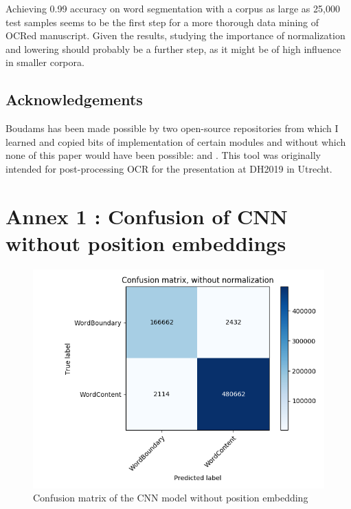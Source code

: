 \documentclass{jdmdh}
\begin{document}
Achieving 0.99 accuracy on word segmentation with a corpus as large as 25,000 test samples seems to be the first step for a more thorough data mining of OCRed manuscript. Given the results, studying the importance of normalization and lowering should probably be a further step, as it might be of high influence in smaller corpora. 

\subsection{Acknowledgements}

Boudams has been made possible by two open-source repositories from which I learned and copied bits of implementation of certain modules and without which none of this paper would have been possible: \citet{enrique_manjavacas_2019_2654987} and \citet{bentrevett}. This tool was originally intended for post-processing OCR for the presentation \citet{pinchecampsclerice} at DH2019 in Utrecht.






\appendix\footnotesize

\section{Annex 1 : Confusion of CNN without position embeddings}

\begin{figure}[H]
  \centering
  \includegraphics[width=\linewidth]{confusion.png}
  \caption{Confusion matrix of the CNN model without position embedding}
  \label{fig:confusion_matrix}
\end{figure}
\end{document}
